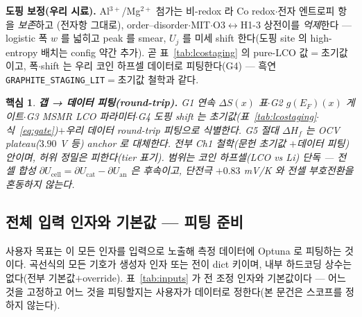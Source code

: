 \documentclass[11pt,a4paper]{article}
\newtheorem*{keybox}{핵심}
\newcommand{\cell}{\mathrm{cell}}
\newcommand{\code}[1]{\texttt{#1}}
\begin{document}
\textbf{도핑 보정(우리 시료).} Al$^{3+}$/Mg$^{2+}$ 첨가는 비-redox 라 Co redox$\cdot$전자 엔트로피 항을 \emph{보존}하고
(전자항 그대로), order--disorder$\cdot$MIT$\cdot$O3$\leftrightarrow$H1-3 상전이를 \emph{억제}한다 — logistic 폭 $w$ 를
넓히고 peak 를 smear, $U_j$ 를 미세 shift 한다(도핑 site 의 high-entropy 배치는 config 약간 추가). 곧
표~\ref{tab:lcostaging} 의 pure-LCO 값$=$초기값이고, 폭$\cdot$shift 는 우리 코인 하프셀 데이터로 피팅한다(G4) —
흑연 \code{GRAPHITE\_STAGING\_LIT}$=$초기값 철학과 같다.

\begin{keybox}
\textbf{갭 → 데이터 피팅(round-trip).} G1 연속 $\Delta S(x)$ 표$\cdot$G2 $g(E_F)(x)$ 게이트$\cdot$G3 MSMR LCO
파라미터$\cdot$G4 도핑 shift 는 초기값(표~\ref{tab:lcostaging}$\cdot$식~\eqref{eq:gate})$+$우리 데이터 round-trip
피팅으로 식별한다. G5 절대 $\Delta H_{f}$ 는 OCV plateau($3.90$ V 등) anchor 로 대체한다. 전부 Ch1 철학(문헌 초기값
$+$데이터 피팅) 안이며, 허위 정밀은 피한다(tier 표기). 범위는 코인 하프셀(LCO vs Li) 단독 — 전셀 합성
$\partial U_\cell=\partial U_\mathrm{cat}-\partial U_\mathrm{an}$ 은 후속이고, 단전극 $+0.83$ mV/K 와 전셀
부호전환을 혼동하지 않는다.
\end{keybox}

\subsection{전체 입력 인자와 기본값 — 피팅 준비}
사용자 목표는 이 모든 인자를 입력으로 노출해 측정 데이터에 Optuna 로 피팅하는 것이다. 곡선식의 모든 기호가 생성자 인자
또는 전이 dict 키이며, 내부 하드코딩 상수는 없다(전부 기본값$+$override). 표~\ref{tab:inputs} 가 전 조정 인자와
기본값이다 — 어느 것을 고정하고 어느 것을 피팅할지는 사용자가 데이터로 정한다(본 문건은 스코프를 정하지 않는다).
\end{document}
